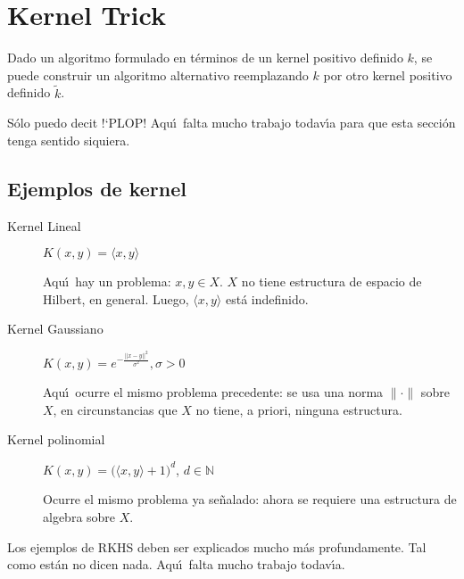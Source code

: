 
\section{Kernel Trick}

\begin{mydef}
Dado un algoritmo formulado en t\'erminos de un kernel positivo
definido $k$, se puede construir un algoritmo alternativo
reemplazando $k$ por otro kernel positivo definido $\tilde{k}$.
\end{mydef}

\begin{myremark}
S\'olo puedo decit !`PLOP!
Aqu\'\i\ falta mucho trabajo todav\'\i a para que esta secci\'on
tenga sentido siquiera.
\end{myremark}

\subsection{Ejemplos de kernel}

\begin{description}
\item[Kernel Lineal]
$K(x,y) = \langle x,y \rangle$
\begin{myremark}
Aqu\'\i\ hay un problema: 
$x,y\in X$.
$X$ no tiene estructura de espacio de Hilbert, en general.
Luego, $\langle x,y\rangle$ est\'a indefinido.
\end{myremark}

\item[Kernel Gaussiano]
$K(x,y) = e^{-\frac{||x-y||^2}{\sigma^2}}, \sigma > 0$
\begin{myremark}
Aqu\'\i\ ocurre el mismo problema precedente: 
se usa una norma $\|\cdot\|$ sobre $X$, en circunstancias que $X$
no tiene, a priori, ninguna estructura.
\end{myremark}

\item[Kernel polinomial] 
$K(x,y) = \big( \langle x,y\rangle + 1\big)^d$, $d\in\mathbb{N}$
\begin{myremark}
Ocurre el mismo problema ya se\~nalado: ahora se requiere una estructura
de algebra sobre $X$.
\end{myremark}
\end{description}

\begin{myremark}
Los ejemplos de RKHS deben ser explicados mucho m\'as profundamente.
Tal como est\'an no dicen nada.
Aqu\'\i\ falta mucho trabajo todav\'\i a.
\end{myremark}
